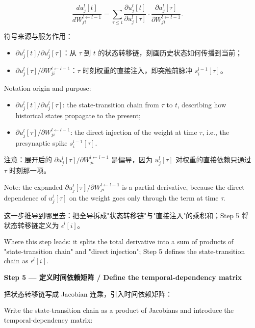 \documentclass[journal,12pt,onecolumn]{IEEEtran}
\begin{document}
\begin{equation}
\frac{du_j^l[t]}{dW_{ji}^{l\leftarrow l-1}} = \sum_{\tau \le t} \frac{\partial u_j^l[t]}{\partial u_j^l[\tau]} \cdot \frac{\partial u_j^l[\tau]}{\partial W_{ji}^{l\leftarrow l-1}}.
\end{equation}

符号来源与服务作用：
\begin{itemize}[leftmargin=1.5em,itemsep=2pt]
\item $\partial u_j^l[t]/\partial u_j^l[\tau]$：从 $\tau$ 到 $t$ 的状态转移链，刻画历史状态如何传播到当前；
\item $\partial u_j^l[\tau]/\partial W_{ji}^{l\leftarrow l-1}$：$\tau$ 时刻权重的直接注入，即突触前脉冲 $s_i^{l-1}[\tau]$。
\end{itemize}

Notation origin and purpose:
\begin{itemize}[leftmargin=1.5em,itemsep=2pt]
\item $\partial u_j^l[t]/\partial u_j^l[\tau]$: the state-transition chain from $\tau$ to $t$, describing how historical states propagate to the present;
\item $\partial u_j^l[\tau]/\partial W_{ji}^{l\leftarrow l-1}$: the direct injection of the weight at time $\tau$, i.e., the presynaptic spike $s_i^{l-1}[\tau]$.
\end{itemize}

注意：展开后的 $\partial u_j^l[\tau]/\partial W_{ji}^{l\leftarrow l-1}$ 是偏导，因为 $u_j^l[\tau]$ 对权重的直接依赖只通过 $\tau$ 时刻那一项。

Note: the expanded $\partial u_j^l[\tau]/\partial W_{ji}^{l\leftarrow l-1}$ is a partial derivative, because the direct dependence of $u_j^l[\tau]$ on the weight goes only through the term at time $\tau$.

这一步推导到哪里去：把全导拆成"状态转移链"与"直接注入"的乘积和；Step 5 将状态转移链定义为 $\epsilon^l[i]$。

Where this step leads: it splits the total derivative into a sum of products of "state-transition chain" and "direct injection"; Step 5 defines the state-transition chain as $\epsilon^l[i]$.

\medskip\noindent\textbf{Step 5 — 定义时间依赖矩阵 / Define the temporal-dependency matrix}

把状态转移链写成 Jacobian 连乘，引入时间依赖矩阵：

Write the state-transition chain as a product of Jacobians and introduce the temporal-dependency matrix:
\end{document}
